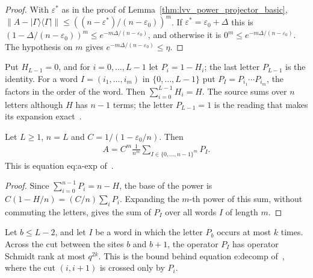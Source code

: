 \begin{proof}
    \leanok
    With $\varepsilon^*$ as in the proof of
    Lemma~\ref{thm:lvv_power_projector_basic},
    $\|A-|\Gamma\rangle\langle\Gamma|\|\le((n-\varepsilon^*)/(n-\varepsilon_0))^m$.
    If $\varepsilon^*=\varepsilon_0+\Delta$ this is
    $(1-\Delta/(n-\varepsilon_0))^m\le e^{-m\Delta/(n-\varepsilon_0)}$, and
    otherwise it is $0^m\le e^{-m\Delta/(n-\varepsilon_0)}$. The hypothesis on $m$ gives
    $e^{-m\Delta/(n-\varepsilon_0)}\le\eta$.
\end{proof}

\begin{definition}
    \label{def:lvv_power_letters}
    \leanok
    Put $H_{L-1}=0$, and for $i=0,\ldots,L-1$ let $P_i=1-H_i$; the last letter
    $P_{L-1}$ is the identity. For a word $I=(i_1,\ldots,i_m)$ in
    $\{0,\ldots,L-1\}$ put $P_I=P_{i_1}\cdots P_{i_m}$, the factors in the order
    of the word. Then $\sum_{i=0}^{L-1}H_i=H$. The source sums over $n$ letters
    although $H$ has $n-1$ terms; the letter $P_{L-1}=1$ is the reading that
    makes its expansion exact~\cite{gap:lvv13_power_expansion_padding}.
\end{definition}

\begin{lemma}
    \label{thm:lvv_power_expansion}
    \leanok
    Let $L\ge1$, $n=L$ and $C=1/(1-\varepsilon_0/n)$. Then
    \begin{align*}
        A=C^m\frac{1}{n^m}\sum_{I\in\{0,\ldots,n-1\}^m}P_I.
    \end{align*}
    This is equation eq:a-exp of~\cite[lines 606--609]{Landau2015Polynomial}.
\end{lemma}

\begin{proof}
    \leanok
    Since $\sum_{i=0}^{n-1}P_i=n-H$, the base of the power is
    $C(1-H/n)=(C/n)\sum_iP_i$. Expanding the $m$-th power of this sum, without
    commuting the letters, gives the sum of $P_I$ over all words $I$ of length
    $m$.
\end{proof}

\begin{lemma}
    \label{thm:lvv_power_word_rank}
    \leanok
    Let $b\le L-2$, and let $I$ be a word in which the letter $P_b$ occurs at most
    $k$ times. Across the cut between the sites $b$ and $b+1$, the operator
    $P_I$ has operator Schmidt rank at most $q^{2k}$. This is the bound behind
    equation e:decomp of~\cite[lines 584--588]{Landau2015Polynomial}, where the
    cut $(i,i+1)$ is crossed only by $P_i$.
\end{lemma}

